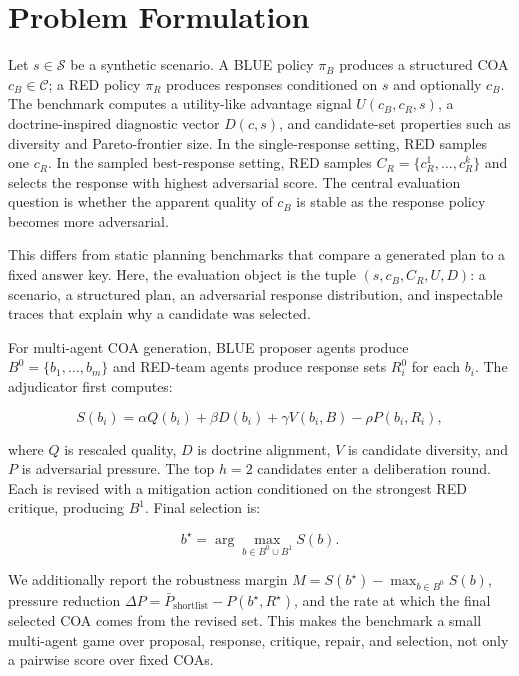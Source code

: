 \documentclass[letterpaper]{article}
\begin{document}
\section{Problem Formulation}

Let $s \in \mathcal{S}$ be a synthetic scenario. A BLUE policy $\pi_B$ produces a structured COA $c_B \in \mathcal{C}$; a RED policy $\pi_R$ produces responses conditioned on $s$ and optionally $c_B$. The benchmark computes a utility-like advantage signal $U(c_B,c_R,s)$, a doctrine-inspired diagnostic vector $D(c,s)$, and candidate-set properties such as diversity and Pareto-frontier size. In the single-response setting, RED samples one $c_R$. In the sampled best-response setting, RED samples $C_R=\{c_R^1,\ldots,c_R^k\}$ and selects the response with highest adversarial score. The central evaluation question is whether the apparent quality of $c_B$ is stable as the response policy becomes more adversarial.

This differs from static planning benchmarks that compare a generated plan to a fixed answer key. Here, the evaluation object is the tuple $(s,c_B,C_R,U,D)$: a scenario, a structured plan, an adversarial response distribution, and inspectable traces that explain why a candidate was selected.

For multi-agent COA generation, BLUE proposer agents produce $B^0=\{b_1,\ldots,b_m\}$ and RED-team agents produce response sets $R_i^0$ for each $b_i$. The adjudicator first computes:

\begin{equation}
S(b_i) = \alpha Q(b_i)+\beta D(b_i)+\gamma V(b_i,B)-\rho P(b_i,R_i),
\end{equation}

where $Q$ is rescaled quality, $D$ is doctrine alignment, $V$ is candidate diversity, and $P$ is adversarial pressure. The top $h=2$ candidates enter a deliberation round. Each is revised with a mitigation action conditioned on the strongest RED critique, producing $B^1$. Final selection is:

\begin{equation}
b^\star = \arg\max_{b \in B^0 \cup B^1} S(b).
\end{equation}

We additionally report the robustness margin $M=S(b^\star)-\max_{b\in B^0}S(b)$, pressure reduction $\Delta P=\bar{P}_{\mathrm{shortlist}}-P(b^\star,R^\star)$, and the rate at which the final selected COA comes from the revised set. This makes the benchmark a small multi-agent game over proposal, response, critique, repair, and selection, not only a pairwise score over fixed COAs.
\end{document}
